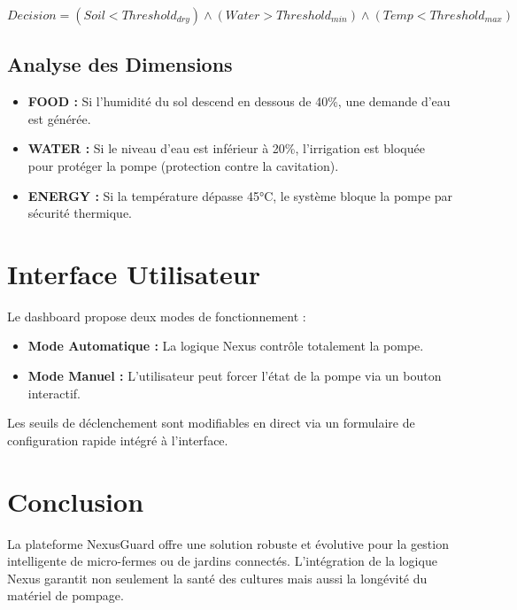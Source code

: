 \documentclass[12pt,a4paper]{article}
\begin{document}
\begin{equation}
Decision = (Soil < Threshold_{dry}) \land (Water > Threshold_{min}) \land (Temp < Threshold_{max})
\end{equation}

\subsection{Analyse des Dimensions}
\begin{itemize}
    \item \textbf{FOOD :} Si l'humidité du sol descend en dessous de 40\%, une demande d'eau est générée.
    \item \textbf{WATER :} Si le niveau d'eau est inférieur à 20\%, l'irrigation est bloquée pour protéger la pompe (protection contre la cavitation).
    \item \textbf{ENERGY :} Si la température dépasse 45°C, le système bloque la pompe par sécurité thermique.
\end{itemize}

\section{Interface Utilisateur}
Le dashboard propose deux modes de fonctionnement :
\begin{itemize}
    \item \textbf{Mode Automatique :} La logique Nexus contrôle totalement la pompe.
    \item \textbf{Mode Manuel :} L'utilisateur peut forcer l'état de la pompe via un bouton interactif.
\end{itemize}
Les seuils de déclenchement sont modifiables en direct via un formulaire de configuration rapide intégré à l'interface.

\section{Conclusion}
La plateforme NexusGuard offre une solution robuste et évolutive pour la gestion intelligente de micro-fermes ou de jardins connectés. L'intégration de la logique Nexus garantit non seulement la santé des cultures mais aussi la longévité du matériel de pompage.
\end{document}
